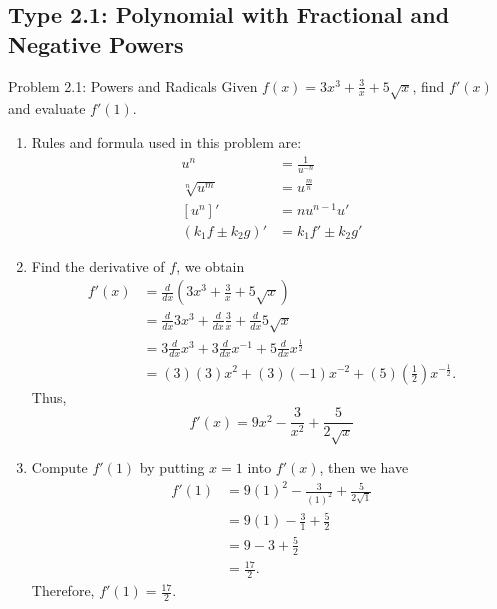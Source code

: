 \documentclass[11pt,a4paper]{article}
\begin{document}
\subsection{Type 2.1: Polynomial with Fractional and Negative Powers}
\begin{problembox}{Problem 2.1: Powers and Radicals}
Given $f(x) = 3x^3 + \frac{3}{x} + 5\sqrt{x}$, find $f'(x)$ and evaluate $f'(1)$.
\end{problembox}
\begin{solutionbox}
\begin{enumerate}
	\item [Step 1.] Rules and formula used in this problem are:
	\begin{align*}
		u^n &= \frac{1}{u^{-n}} \\
		\sqrt[n]{u^m} &= u^{\frac{m}{n}} \\
		[u^n]' &= n u^{n-1} u' \\
		(k_1f \pm k_2 g)' &= k_1f' \pm k_2g'
	\end{align*}
	
	\item [Step 2.] Find the derivative of $f$, we obtain
	\begin{align*}
		f'(x) &= \frac{d}{dx} \left(3x^3 + \frac{3}{x} + 5\sqrt{x}\right) \\
		&= \frac{d}{dx} 3x^3 + \frac{d}{dx} \frac{3}{x} + \frac{d}{dx} 5\sqrt{x} \\
		&= 3 \frac{d}{dx} x^3 + 3 \frac{d}{dx} x^{-1} + 5 \frac{d}{dx} x^{\frac{1}{2}} \\
		&= (3)(3)x^2 + (3)(-1)x^{-2} + (5)\left(\frac{1}{2}\right)x^{-\frac{1}{2}}.
	\end{align*}
	Thus,
	\begin{equation*}
		f'(x) = 9x^2 - \frac{3}{x^2} + \frac{5}{2\sqrt{x}}
	\end{equation*}
	
	\item [Step 3.] Compute $f'(1)$ by putting $x = 1$ into $f'(x)$, then we have
	\begin{align*}
		f'(1) &= 9(1)^2 - \frac{3}{(1)^2} + \frac{5}{2\sqrt{1}} \\
		&= 9(1) - \frac{3}{1} + \frac{5}{2} \\
		&= 9 - 3 + \frac{5}{2} \\
		&= \frac{17}{2}.
	\end{align*}
	Therefore, $f'(1) = \frac{17}{2}$.
	\end{enumerate}
\end{solutionbox}
\end{document}
